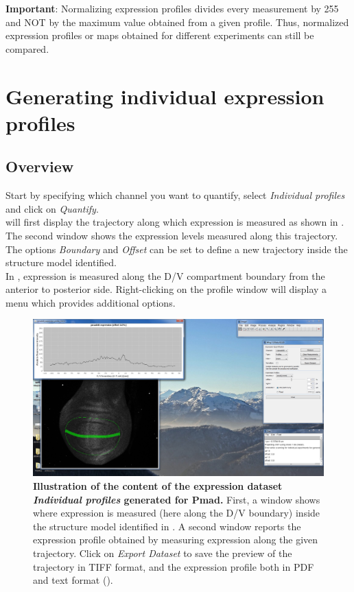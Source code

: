 \textbf{Important}: Normalizing expression profiles divides every measurement by 255 and NOT by the maximum value obtained from a given profile. Thus, normalized expression profiles or maps obtained for different experiments can still be compared.

\section{Generating individual expression profiles}\label{sec:expression_profiles}
\subsection{Overview}
Start by specifying which channel you want to quantify, select \textit{Individual profiles} and click on \textit{Quantify}.\\

\wingj will first display the trajectory along which expression is measured as shown in . The second window shows the expression levels measured along this trajectory. The options \textit{Boundary} and \textit{Offset} can be set to define a new trajectory inside the structure model identified.\\

In , expression is measured along the D/V compartment boundary from the anterior to posterior side. Right-clicking on the profile window will display a menu which provides additional options.\\

\begin{figure}[!h]
\centering
\includegraphics[scale=0.215]{images/wingj_expression_profiles_preview.jpg}
\caption{\textbf{Illustration of the content of the expression dataset \textit{Individual profiles} generated for Pmad.} First, a window shows where expression is measured (here along the D/V boundary) inside the structure model identified in . A second window reports the expression profile obtained by measuring expression along the given trajectory. Click on \textit{Export Dataset} to save the preview of the trajectory in TIFF format, and the expression profile both in PDF and text format ().}
\label{fig:wingj_expression_profiles_preview}
\end{figure}


